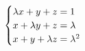 \documentclass[preview]{standalone}
\begin{document}
\begin{align*}
\special{dvisvgm:raw <g id='unique000'>}\begin{cases}\lambda x+y+z=1\\x+\lambda y+z=\lambda\\x+y+\lambda z=\lambda^2\end{cases}\special{dvisvgm:raw </g>}
\end{align*}
\end{document}

